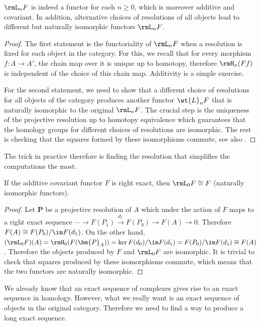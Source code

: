 \begin{prop}
    $\rmL_n F$ is indeed a functor for each $n\geq 0$, which is moreover additive and covariant. In addition, alternative choices of resolutions of all objects lead to different but naturally isomorphic functors $\rmL_n F$.
\end{prop}
\begin{proof}
     The first statement is the functoriality of $\rmL_n F$ when a resolution is fixed for each object in the category. For this, we recall that for every morphism $f:A\to A'$, the chain map over it is unique up to homotopy, therefore $\rmH_n(F f)$ is independent of the choice of this chain map. Additivity is a simple exercise.
     
     For the second statement, we need to show that a different choice of resolutions for all objects of the category produces another functor $\wt{L}_n F$ that is naturally isomorphic to the original $\rmL_n F$. The crucial step is the uniqueness of the projective resolution up to homotopy equivalence which guarantees that the homology groups for different choices of resolutions are isomorphic. The rest is checking that the squares formed by these isomorphisms commute, see also \cite[Prop.~6.20]{Rotman}.
\end{proof}


The trick in practice therefore is finding the resolution that simplifies the computations the most.


\begin{lem}
    If the additive covariant functor $F$ is right exact, then $\rmL_0 F\cong F$ (naturally isomorphic functors).
\end{lem}
\begin{proof}
     Let $\bm{P}$ be a projective resolution of $A$ which under the action of $F$ maps to a right exact sequence $\cdots\to F(P_1)\overset{d_1}\to F(P_0)\to F(A)\to 0$. Therefore $F(A)\cong F(P_0)/\im F(d_1)$. On the other hand, $(\rmL_0 F)(A)=\rmH_0(F(\bm{P}_A))=\ker F(d_0)/\im F(d_1)=F(P_0)/\im F(d_1)\cong F(A)$. Therefore the objects produced by $F$ and $\rmL_0F$ are isomorphic. It is trivial to check that squares produced by these isomorphisms commute, which means that the two functors are naturally isomorphic.
\end{proof}


We already know that an exact sequence of complexes gives rise to an exact sequence in homology. However, what we really want is an exact sequence of objects in the original category. Therefore we need to find a way to produce a long exact sequence.

